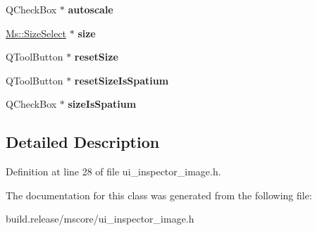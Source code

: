 \begin{DoxyCompactItemize}
Q\+Check\+Box $\ast$ {\bfseries autoscale}
\item 
\mbox{\label{class_ui___inspector_image_ac2a37bed078a4512c5c0246c7adb2c86}} 
\hyperlink{class_ms_1_1_size_select}{Ms\+::\+Size\+Select} $\ast$ {\bfseries size}
\item 
\mbox{\label{class_ui___inspector_image_aa192d68aec60dd60d4cee318d95bd1ac}} 
Q\+Tool\+Button $\ast$ {\bfseries reset\+Size}
\item 
\mbox{\label{class_ui___inspector_image_a56a71a40802938321b90cdb4b9a314d3}} 
Q\+Tool\+Button $\ast$ {\bfseries reset\+Size\+Is\+Spatium}
\item 
\mbox{\label{class_ui___inspector_image_a0e248f1c78f9a79416c2899d3f415a21}} 
Q\+Check\+Box $\ast$ {\bfseries size\+Is\+Spatium}
\end{DoxyCompactItemize}


\subsection{Detailed Description}


Definition at line 28 of file ui\+\_\+inspector\+\_\+image.\+h.



The documentation for this class was generated from the following file\+:\begin{DoxyCompactItemize}
\item 
build.\+release/mscore/ui\+\_\+inspector\+\_\+image.\+h\end{DoxyCompactItemize}
